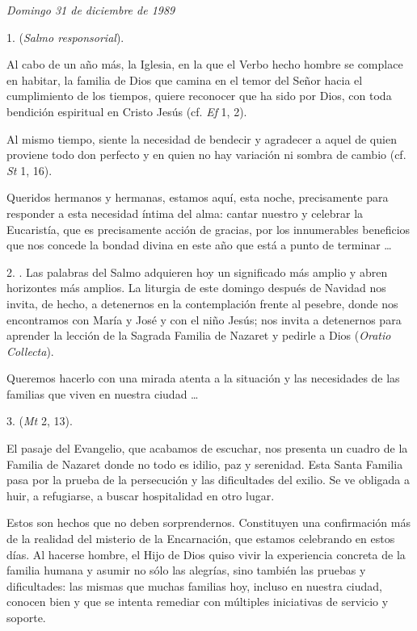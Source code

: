 \begin{body}
	\emph{Domingo 31 de diciembre de 1989}

	\begin{body}
		1.  (\emph{Salmo responsorial}).

		Al cabo de un año más, la Iglesia,  en la que el Verbo hecho hombre se complace en habitar, la familia de Dios que camina en el temor del Señor hacia el cumplimiento de los tiempos, quiere reconocer que ha sido  por Dios, con toda bendición espiritual en Cristo Jesús (cf. \emph{Ef} 1, 2).

		Al mismo tiempo, siente la necesidad de bendecir y agradecer a aquel de quien proviene todo don perfecto y en quien no hay variación ni sombra de cambio (cf. \emph{St} 1, 16).

		Queridos hermanos y hermanas, estamos aquí, esta noche, precisamente para responder a esta necesidad íntima del alma: cantar nuestro  y celebrar la Eucaristía, que es precisamente acción de gracias, por los innumerables beneficios que nos concede la bondad divina en este año que está a punto de terminar \ldots{}

		2. . Las palabras del Salmo adquieren hoy un significado más amplio y abren horizontes más amplios. La liturgia de este domingo después de Navidad nos invita, de hecho, a detenernos en la contemplación frente al pesebre, donde nos encontramos con María y José y con el niño Jesús; nos invita a detenernos para aprender la lección de la Sagrada Familia de Nazaret y pedirle a Dios  (\emph{Oratio Collecta}).

		Queremos hacerlo con una mirada atenta a la situación y las necesidades de las familias que viven en nuestra ciudad \ldots{}

		3.  (\emph{Mt} 2, 13).

		El pasaje del Evangelio, que acabamos de escuchar, nos presenta un cuadro de la Familia de Nazaret donde no todo es idilio, paz y serenidad. Esta Santa Familia pasa por la prueba de la persecución y las dificultades del exilio. Se ve obligada a huir, a refugiarse, a buscar hospitalidad en otro lugar.

		Estos son hechos que no deben sorprendernos. Constituyen una confirmación más de la realidad del misterio de la Encarnación, que estamos celebrando en estos días. Al hacerse hombre, el Hijo de Dios quiso vivir la experiencia concreta de la familia humana y asumir no sólo las alegrías, sino también las pruebas y dificultades: las mismas que muchas familias hoy, incluso en nuestra ciudad, conocen bien y que se intenta remediar con múltiples iniciativas de servicio y soporte.


\end{body}
\end{body}

